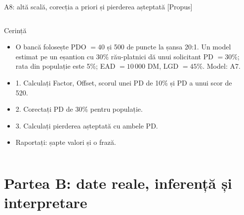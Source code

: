 \begin{frame}{A8: altă scală, corecția a priori și pierderea așteptată [Propus]}
\propsub
\itemsize{\scriptsize}
\begin{columns}[T]
\begin{column}{\taskw}
\begin{block}{Cerință}
\begin{itemize}
    \item O bancă folosește PDO $= 40$ și 500 de puncte la șansa 20:1. Un model estimat pe un eșantion cu 30\% rău-platnici dă unui solicitant PD $= 30\%$; rata din populație este 5\%; EAD $= 10\,000$ DM, LGD $= 45\%$. Model: A7.
    \item 1. Calculați Factor, Offset, scorul unei PD de 10\% și PD a unui scor de 520.
    \item 2. Corectați PD de 30\% pentru populație.
    \item 3. Calculați pierderea așteptată cu ambele PD.
    \item Raportați: șapte valori și o frază.
\end{itemize}
\end{block}
\end{column}
\begin{column}{\solw}
\end{column}
\end{columns}
\end{frame}


\section{Partea B: date reale, inferență și interpretare}

